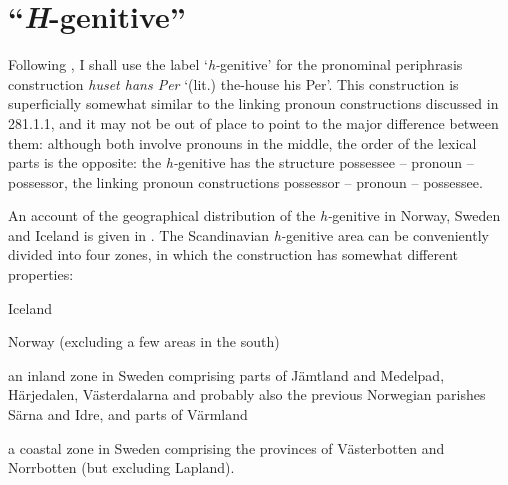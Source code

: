 \section{“\textit{H}{}-genitive”}
\label{bkm:Ref154988643}
\begin{styleBodyTextFirst}
Following \citet{Delsing2003b}, I shall use the label ‘\textit{h-}genitive’ for the pronominal periphrasis construction \textit{huset hans Per} ‘(lit.) the-house his Per’. This construction is superficially somewhat similar to the linking pronoun constructions discussed in 281.1.1, and it may not be out of place to point to the major difference between them: although both involve pronouns in the middle, the order of the lexical parts is the opposite: the \textit{h-}genitive has the structure possessee – pronoun – possessor, the linking pronoun constructions possessor – pronoun – possessee.

\end{styleBodyTextFirst}

\begin{styleBodytextC}
An account of the geographical distribution of the \textit{h-}genitive in Norway, Sweden and Iceland is given in \citet[34]{Delsing2003a}. The Scandinavian \textit{h-}genitive area can be conveniently divided into four zones, in which the construction has somewhat different properties:

\end{styleBodytextC}


\begin{listWWNumxleveli}
\item 

\begin{styleListii}
Iceland

\end{styleListii}

\item 

\begin{styleListii}
Norway (excluding a few areas in the south) 

\end{styleListii}

\item 

\begin{styleListii}
an inland zone in Sweden comprising parts of Jämtland and Medelpad, Härjedalen, Västerdalarna and probably also the previous Norwegian parishes Särna and Idre, and parts of Värmland

\end{styleListii}

\item 

\begin{styleListii}
a coastal zone in Sweden comprising the provinces of Västerbotten and Norrbotten (but excluding Lapland).

\end{styleListii}

\end{listWWNumxleveli}

